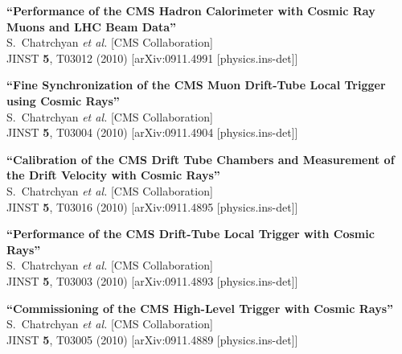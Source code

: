 \documentclass[10pt, a4paper]{article}
\begin{document}
\begin{thebibliography}{599}
{\bf ``Performance of the CMS Hadron Calorimeter with Cosmic Ray Muons and LHC Beam Data''}
  \\{}S.~Chatrchyan {\it et al.}  [CMS Collaboration]
  \\{}JINST {\bf 5}, T03012 (2010)
  [arXiv:0911.4991 [physics.ins-det]]

{\bf ``Fine Synchronization of the CMS Muon Drift-Tube Local Trigger using Cosmic Rays''}
  \\{}S.~Chatrchyan {\it et al.}  [CMS Collaboration]
  \\{}JINST {\bf 5}, T03004 (2010)
  [arXiv:0911.4904 [physics.ins-det]]

{\bf ``Calibration of the CMS Drift Tube Chambers and Measurement of the Drift Velocity with Cosmic Rays''}
  \\{}S.~Chatrchyan {\it et al.}  [CMS Collaboration]
  \\{}JINST {\bf 5}, T03016 (2010)
  [arXiv:0911.4895 [physics.ins-det]]

{\bf ``Performance of the CMS Drift-Tube Local Trigger with Cosmic Rays''}
  \\{}S.~Chatrchyan {\it et al.}  [CMS Collaboration]
  \\{}JINST {\bf 5}, T03003 (2010)
  [arXiv:0911.4893 [physics.ins-det]]

{\bf ``Commissioning of the CMS High-Level Trigger with Cosmic Rays''}
  \\{}S.~Chatrchyan {\it et al.}  [CMS Collaboration]
  \\{}JINST {\bf 5}, T03005 (2010)
  [arXiv:0911.4889 [physics.ins-det]]


\end{thebibliography}
\end{document}
